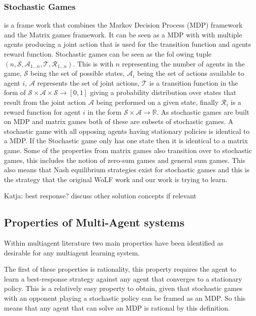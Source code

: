 \documentclass{article}
\newcommand\katja[1]{{\color{dark-cyan}Katja: #1}}
\begin{document}
\subsubsection{Stochastic Games} is a frame work that combines the Markov Decision Process (MDP) framework and the 
Matrix games framework. It can be seen as a MDP with with multiple agents producing 
a joint action that is used for the transition function and agents reward function. Stochastic games can be seen as the fol owing tuple $(n, \mathcal{S}, \mathcal{A}_{1...n}, 
\mathcal{T}, \mathcal{R}_{1...n})$. This is with $n$ representing the number of agents 
in the game, $\mathcal{S}$ being the set of possible states, $\mathcal{A}_{i}$ being the 
set of actions available to agent $i$, $\mathcal{A}$ represents the set of joint actions, 
$\mathcal{T}$ is a transition function in the form of 
$\mathcal{S}\times\mathcal{A}\times\mathcal{S}\rightarrow [0, 1]$ giving a probability 
distribution over states that result from the joint action $\mathcal{A}$ being performed
on a given state, finally $\mathcal{R}_{i}$ is a reward function for agent $i$ in the form
$\mathcal{S}\times\mathcal{A}\rightarrow \mathbb{R}$. As stochastic games are built on MDP and matrix games both of these are subsets of
stochastic games. A stochastic game with all opposing agents having stationary policies
is identical to a MDP. If the Stochastic game only has one state then it is identical 
to a matrix game. Some of the properties from matrix games also transition over to stochastic games, 
this includes the notion of zero-sum games and general sum games. This also means
that Nash equilibrium strategies exist for stochastic games and this is the strategy
that the original WoLF work and our work is trying to learn.

\katja{best response? discuss other solution concepts if relevant}

\subsection{Properties of Multi-Agent systems}

Within multiagent literature two main properties have
been identified as desirable for any multiagent learning
system.

The first of these properties is rationality, this property requires
the agent to learn a best-response strategy against any agent that 
converges to a stationary policy. This is a relatively easy property to 
obtain, given that stochastic games with an opponent playing a stochastic 
policy can be framed as an MDP. So this means that any agent that can 
solve an MDP is rational by this definition.
\end{document}
